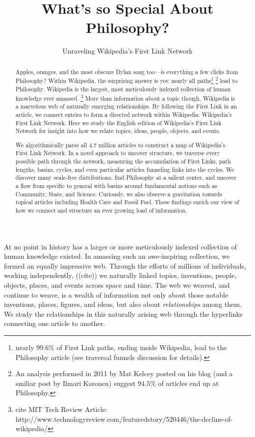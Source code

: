 \documentclass[twoside]{article}
\title{\vspace{-5mm}%
	\fontsize{24pt}{12pt}\selectfont
	\textbf{What's so Special About Philosophy?} 
	}
\author{%
\fontsize{14pt}{14pt}\selectfont
	Unraveling Wikipedia's First Link Network \vspace{-2mm}\\
	}
\date{}
\begin{document}
\maketitle
\thispagestyle{fancy}

\begin{abstract}
\fontsize{12pt}{12pt}
\selectfont

Apples, oranges, and the most obscure Dylan song too---is everything a few clicks from Philosophy? 
Within Wikipedia, the surprising answer is yes: nearly all 
paths\footnote{
nearly $99.6\%$ of First Link paths, ending inside Wikipedia, lead to the Philosophy article (see traversal funnels discussion for details).}
\footnote{
An analysis performed in 2011 by Mat Kelcey posted on his blog (and a smiliar post by Ilmari Karonen) suggest $94.5\%$ of articles end up at Philosophy.
}
lead to Philosophy.
Wikipedia is the largest, most meticulously indexed collection of human knowledge ever amassed. 
\footnote{
cite MIT Tech Review Article: http://www.technologyreview.com/featuredstory/520446/the-decline-of-wikipedia/
}
More than information about a topic though, Wikipedia is a marvelous web of naturally emerging relationships.  
By following the First Link in an article, we connect entries to form a directed network within Wikipedia: Wikipedia's First Link Network. 
Here we study the English edition of Wikipedia's First Link Network for insight into how we relate topics, ideas, people, objects, and events.  


We algorithmically parse all 4.7 million articles to construct a map of Wikipedia's First Link Network. 
In a novel approach to uncover structure, we traverse every possible path through the network, 
measuring the accumulation of First Links, path lengths, basins, cycles, and even particular articles funneling links into the cycles.
We discover many scale-free distributions, find Philosophy at a salient center, and uncover a flow from specific to general with 
basins around fundamental notions such as Community, State, and Science. 
Curiously, we also observe a gravitation towards topical articles including Health Care and Fossil Fuel.
These findings enrich our view of how we connect and structure
an ever growing load of information.

\end{abstract}

\fontsize{11pt}{11pt}
\selectfont

At no point in history has a larger or more meticulously indexed collection of human knowledge existed.
In amassing such an awe-inspiring collection, we formed an equally impressive web. 
Through the efforts of millions of individuals, working independently,
((cite))
we naturally linked topics, inventions, people, objects, places, and events across space and time.
The web we weaved, and continue to weave, is a wealth of information not only about those notable inventions, 
places, figures, and ideas, but also about \textit{relationships} among them.
We study the relationships in this naturally arising web through the hyperlinks connecting one article to another.
\end{document}
